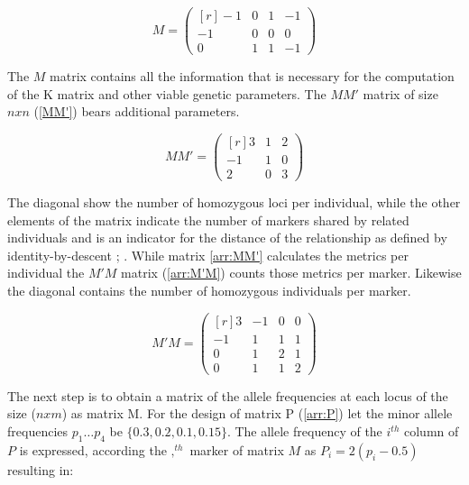 \begin{equation}
  M = 
  \begin{pmatrix}[r]
    -1 & 0 &  1 & -1 \\
    -1 & 0 &  0 &  0 \\
     0 & 1 &  1 & -1 
  \end{pmatrix}
  \label{arr:M}
\end{equation}

The $M$ matrix contains all the information that is necessary for the computation of the K matrix and other viable genetic parameters. The $MM'$ matrix of size $n x n$ (\ref{MM'}) bears additional parameters.

\begin{equation}
  MM' = 
  \begin{pmatrix}[r]
    3 &  1 & 2 \\
   -1 &  1 & 0 \\
    2 &  0 & 3 
  \end{pmatrix}
  \label{arr:MM'}
\end{equation}


The diagonal show the number of homozygous loci per individual, while the other elements of the matrix
indicate the number of markers shared by related individuals and is an indicator for the distance of the
relationship as defined by identity-by-descent \cite{vanraden2008efficient}; \cite{misztal2013methods}.  While
matrix \ref{arr:MM'} calculates the metrics per individual the $M'M$ matrix (\ref{arr:M'M}) counts those
metrics per marker. Likewise the diagonal contains the number of homozygous individuals per marker.

\begin{equation}
  M'M = 
  \begin{pmatrix}[r]
    3 & -1 & 0 & 0 \\
   -1 &  1 & 1 & 1 \\
    0 &  1 & 2 & 1 \\
    0 &  1 & 1 & 2 
  \end{pmatrix}
  \label{arr:M'M}
\end{equation}

The next step is to obtain a matrix of the allele frequencies at each locus of the size ($n x m$) as matrix
M. For the design of matrix P (\ref{arr:P}) let the minor allele frequencies $p_1 \dots p_4$ be
$\{0.3, 0.2, 0.1, 0.15\}$. The allele frequency of the $i^{th}$ column of $P$ is expressed, according the $,^{th}$ marker of matrix $M$ as $P_i = 2(p_i - 0.5)$ resulting in: 

